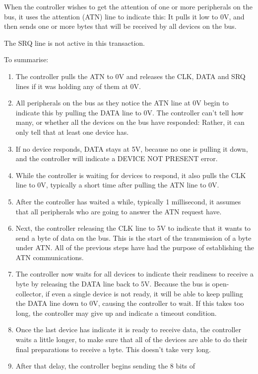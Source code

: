 When the controller wishes to get the attention of one or more
peripherals on the bus, it uses the attention (ATN) line to indicate
this: It pulls it low to 0V, and then sends one or more bytes that
will be received by all devices on the bus.

The SRQ line is not active in this transaction.

To summarise:

\begin{enumerate}
\item The controller pulls the ATN to 0V and releases the CLK, DATA
  and SRQ lines if it was holding any of them at 0V.
\item All peripherals on the bus as they notice the ATN line at 0V
  begin to indicate this by pulling the DATA line to 0V.
  The controller can't tell how many, or whether all the devices
  on the bus have responded: Rather, it can only tell that at least
  one device has.
\item If no device responds, DATA stays at 5V, because no one is
  pulling it down, and the
  controller will indicate a DEVICE NOT PRESENT error.
\item While the controller is waiting for devices to respond, it
  also pulls the CLK line to 0V, typically a short time after
  pulling the ATN line to 0V.
\item After the controller has waited a while, typically 1
  millisecond, it assumes that all peripherals who are going to
  answer the ATN request have.
\item Next, the controller releasing the CLK line to 5V to indicate
  that it wants to send a byte of data on the bus. This is the start
  of the transmission of a byte under ATN. All of the previous steps
  have had the purpose of establishing the ATN communications.
\item The controller now waits for all devices to indicate
  their readiness to receive a byte by releasing the DATA line
  back to 5V. Because the bus is open-collector, if even a
  single device is not ready, it will be able to keep pulling
  the DATA line down to 0V, causing the controller to wait.
  If this takes too long, the controller may give up and
  indicate a timeout condition.
\item Once the last device has indicate it is ready to receive data,
  the controller waits a little longer, to make sure that all of the
  devices are able to do their final preparations to receive a
  byte. This doesn't take very long.
\item After that delay, the controller begins sending the 8 bits of

\end{enumerate}
